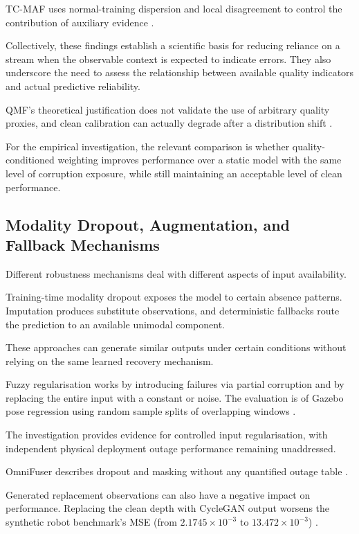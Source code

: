 TC-MAF uses normal-training dispersion and local disagreement to control the contribution of
auxiliary evidence \parencite{P026}.

Collectively, these findings establish a scientific basis for reducing reliance on a stream when the
observable context is expected to indicate errors. They also underscore the need to assess the
relationship between available quality indicators and actual predictive reliability.

QMF's theoretical justification does not validate the use of arbitrary quality proxies, and clean
calibration can actually degrade after a distribution shift \parencite{Zhang2023QMF,P008}.

For the empirical investigation, the relevant comparison is whether quality-conditioned weighting
improves performance over a static model with the same level of corruption exposure, while still
maintaining an acceptable level of clean performance.

\subsection{Modality Dropout, Augmentation, and Fallback Mechanisms}

Different robustness mechanisms deal with different aspects of input availability.

Training-time modality dropout exposes the model to certain absence patterns. Imputation produces
substitute observations, and deterministic fallbacks route the prediction to an available unimodal
component.

These approaches can generate similar outputs under certain conditions without relying on the same
learned recovery mechanism.

Fuzzy regularisation works by introducing failures via partial corruption and by replacing the
entire input with a constant or noise. The evaluation is of Gazebo pose regression using random
sample splits of overlapping windows \parencite[PDF pp.~3--5]{Altinses2023Fuzzy}.

The investigation provides evidence for controlled input regularisation, with independent physical
deployment outage performance remaining unaddressed.

OmniFuser describes dropout and masking without any quantified outage table \parencite[PDF p.~10]{P021}.

Generated replacement observations can also have a negative impact on performance. Replacing the
clean depth with CycleGAN output worsens the synthetic robot benchmark's MSE (from $2.1745 \times
10^{-3}$ to $13.472 \times 10^{-3}$) \parencite[Table~7]{Altinses2025Performance}.

